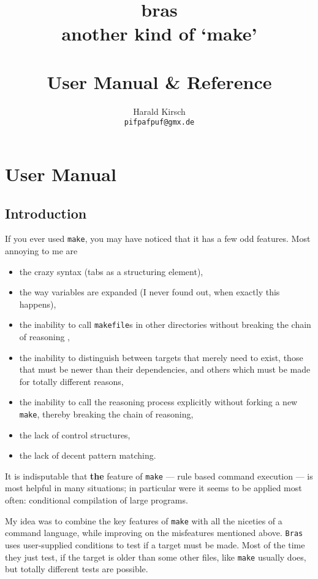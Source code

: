 \documentclass[11pt,bibtotoc,idxtotoc]{scrreprt}
\title{bras\\
another kind of `make'\\[2mm]
\raisebox{0.5\baselineskip}{\rule{4cm}{1pt}}\\
\LARGE\textsf{User Manual \& Reference}}
\author{\relax
Harald Kirsch\\
\texttt{pifpafpuf@gmx.de}
}
\newcommand{\Bras}{\texttt{Bras}}
\newcommand{\make}{\texttt{make}}
\newcommand{\makefile}{\texttt{makefile}}
\begin{document}
\maketitle
\tableofcontents

\chapter{User Manual}
\section{Introduction}
If you ever used \texttt{make}, you may have noticed that it has a few
odd features. Most annoying to me are

\begin{itemize}
\item 
the crazy syntax (tabs as a structuring element),
\item 
the way variables are expanded (I never found out, when exactly
this happens),
\item 
the inability to call \makefile{}s in other directories without
breaking the chain of reasoning \cite{Mil97},
\item the inability to distinguish between targets that merely need to
  exist, those that must be newer than their dependencies, and others
  which must be made for totally different reasons,
\item the inability to call the reasoning process explicitly without
  forking a new \make, thereby breaking the chain of reasoning,
\item the lack of control structures,
\item the lack of decent pattern matching.
\end{itemize}

It is indisputable that \textbf{the} feature of \texttt{make} ---
rule based command execution --- is most helpful in many situations;
in particular were it seems to be applied most often:
conditional compilation of large programs.

My idea was to combine the key features of \texttt{make} with all the
niceties of a command language, while improving on the misfeatures
mentioned above. \Bras{} uses user-supplied conditions to test if a
target must be made. Most of the time they just test, if the target is
older than some other files, like \make{} usually does, but totally
different tests are possible.
\end{document}
